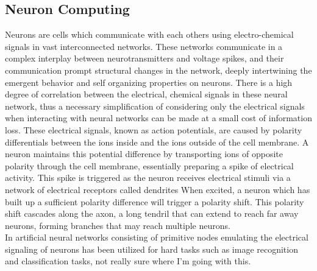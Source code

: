 \subsection{Neuron Computing}
Neurons are cells which communicate with each others using electro-chemical
signals in vast interconnected networks.
These networks communicate in a complex interplay between neurotransmitters and voltage
spikes, and their communication prompt structural changes in the network,
deeply intertwining the emergent behavior and self organizing properties on neurons.
There is a high degree of correlation between the electrical, chemical signals
in these neural network, thus a necessary simplification of considering only the
electrical signals when interacting with neural networks can be made at a small
cost of information loss.
These electrical signals, known as action potentials, are caused
by polarity differentials between the ions inside and the ions outside of the
cell membrane.
A neuron maintains this potential difference by transporting ions of opposite
polarity through the cell membrane, essentially preparing a spike of electrical
activity.
This spike is triggered as the neuron receives electrical stimuli via a network
of electrical receptors called dendrites
When excited, a neuron which has built up a sufficient polarity difference will
trigger a polarity shift.
This polarity shift cascades along the axon, a long tendril that can extend to
reach far away neurons, forming branches that may reach multiple neurons.\\
In artificial neural networks consisting of primitive nodes emulating the
electrical signaling of neurons has been utilized for hard tasks such as image
recognition and classification tasks, not really sure where I'm going with this.
